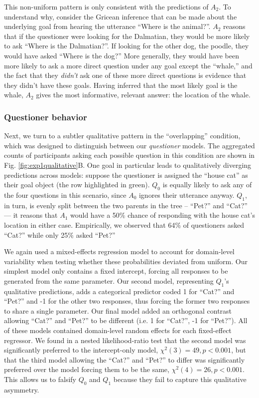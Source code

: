 \documentclass[11pt, floatsintext]{apa6}
\begin{document}
This non-uniform pattern is only consistent with the predictions of $A_2$. 
To understand why, consider the Gricean inference that can be made about the underlying goal from hearing the utterance ``Where is the animal?''.
$A_2$ reasons that if the questioner were looking for the Dalmatian, they would be more likely to ask ``Where is the Dalmatian?''. 
If looking for the other dog, the poodle, they would have asked ``Where is the dog?''
More generally, they would have been more likely to ask a more direct question under any goal except the ``whale,'' and the fact that they \emph{didn't} ask one of these more direct questions is evidence that they didn't have these goals.
Having inferred that the most likely goal is the whale, $A_2$ gives the most informative, relevant answer: the location of the whale.

\subsubsection{Questioner behavior}
Next, we turn to a subtler qualitative pattern in the ``overlapping'' condition, which was designed to distinguish between our \emph{questioner} models. 
The aggregated counts of participants asking each possible question in this condition are shown in Fig. \ref{fig:exp1qualitative}B. 
One goal in particular leads to qualitatively diverging predictions across models: suppose the questioner is assigned the ``house cat'' as their goal object (the row highlighted in green). 
$Q_0$ is equally likely to ask any of the four questions in this scenario, since $A_0$ ignores their utterance anyway. 
$Q_1$, in turn, is evenly split between the two parents in the tree -- ``Pet?'' and ``Cat?'' --- it reasons that $A_1$ would have a 50\% chance of responding with the house cat's location in either case. 
Empirically, we observed that 64\% of questioners asked ``Cat?'' while only 25\% asked ``Pet?''

We again used a mixed-effects regression model to account for domain-level variability when testing whether these probabilities deviated from uniform.
Our simplest model only contains a fixed intercept, forcing all responses to be generated from the same parameter.
Our second model, representing $Q_1$'s qualitative predictions, adds a categorical predictor coded 1 for ``Cat?'' and ``Pet?'' and -1 for the other two responses, thus forcing the former two responses to share a single parameter.
Our final model added an orthogonal contrast allowing ``Cat?'' and ``Pet?'' to be different (i.e. 1 for ``Cat?'', -1 for ``Pet?''). 
All of these models contained domain-level random effects for each fixed-effect regressor.
We found in a nested likelihood-ratio test that the second model was significantly preferred to the intercept-only model, $\chi^2(3) = 49, p < 0.001$, but that the third model allowing the ``Cat?'' and ``Pet?'' to differ was significantly preferred over the model forcing them to be the same, $\chi^2(4) = 26, p < 0.001$.
This allows us to falsify $Q_0$ and $Q_1$ because they fail to capture this qualitative asymmetry.
\end{document}
